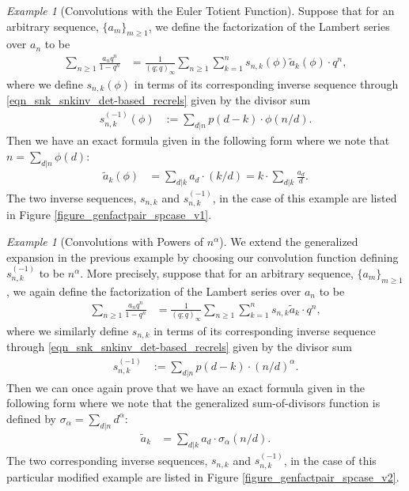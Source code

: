 \documentclass[10pt,reqno]{amsart}
\numberwithin{figure}{section}
\numberwithin{table}{section}
\theoremstyle{plain}
\numberwithin{theorem}{section}
\theoremstyle{remark}
\newtheorem{example}[theorem]{Example}
\begin{document}
\begin{example}[Convolutions with the Euler Totient Function]
Suppose that for an arbitrary sequence, $\{a_m\}_{m \geq 1}$, we define the factorization of the 
Lambert series over $a_n$ to be 
\begin{align*} 
\sum_{n \geq 1} \frac{a_n q^n}{1-q^n} & = \frac{1}{(q; q)_{\infty}} 
     \sum_{n \geq 1} \sum_{k=1}^n s_{n,k}(\phi) \widetilde{a}_k(\phi) \cdot q^n, 
\end{align*} 
where we define $s_{n,k}(\phi)$ in terms of its corresponding inverse sequence through 
\eqref{eqn_snk_snkinv_det-based_recrels} given by the divisor sum 
\begin{align*} 
s_{n,k}^{(-1)}(\phi) & := \sum_{d|n} p(d-k) \cdot \phi(n / d). 
\end{align*} 
Then we have an exact formula given in the following form where we note that 
$n = \sum_{d|n} \phi(d)$: 
\begin{align*} 
\widetilde{a}_k(\phi) & = \sum_{d|k} a_d \cdot (k/d) = k \cdot \sum_{d|k} \frac{a_d}{d}. 
\end{align*} 
The two inverse sequences, $s_{n,k}$ and $s_{n,k}^{(-1)}$, in the case of this example are 
listed in Figure \ref{figure_genfactpair_spcase_v1}. 
\end{example} 

\begin{example}[Convolutions with Powers of $n^{\alpha}$]
We extend the generalized expansion in the previous example by choosing our convolution 
function defining $s_{n,k}^{(-1)}$ to be $n^{\alpha}$. More precisely, 
suppose that for an arbitrary sequence, $\{a_m\}_{m \geq 1}$, we again 
define the factorization of the Lambert series over $a_n$ to be 
\begin{align*} 
\sum_{n \geq 1} \frac{a_n q^n}{1-q^n} & = \frac{1}{(q; q)_{\infty}} 
     \sum_{n \geq 1} \sum_{k=1}^n s_{n,k} \widetilde{a}_k \cdot q^n, 
\end{align*} 
where we similarly define $s_{n,k}$ in terms of its corresponding inverse sequence through 
\eqref{eqn_snk_snkinv_det-based_recrels} given by the divisor sum 
\begin{align*} 
s_{n,k}^{(-1)} & := \sum_{d|n} p(d-k) \cdot (n / d)^{\alpha}. 
\end{align*} 
Then we can once again prove that we have an exact formula given in the 
following form where we note that the generalized sum-of-divisors function is defined by 
$\sigma_{\alpha} = \sum_{d|n} d^{\alpha}$: 
\begin{align*} 
\widetilde{a}_k & = \sum_{d|k} a_d \cdot \sigma_{\alpha}(n/d). 
\end{align*} 
The two corresponding inverse sequences, $s_{n,k}$ and $s_{n,k}^{(-1)}$, 
in the case of this particular modified example are listed in 
Figure \ref{figure_genfactpair_spcase_v2}. 
\end{example} 
\end{document}
